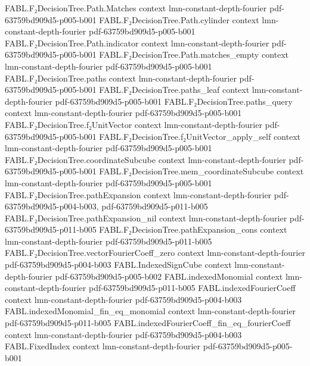 \begin{theorem}
\proofstep
  {FABL.F₂DecisionTree.Path.Matches}
  {context}
  {lmn-constant-depth-fourier}
  {pdf-63759bd909d5-p005-b001}
\proofstep
  {FABL.F₂DecisionTree.Path.cylinder}
  {context}
  {lmn-constant-depth-fourier}
  {pdf-63759bd909d5-p005-b001}
\proofstep
  {FABL.F₂DecisionTree.Path.indicator}
  {context}
  {lmn-constant-depth-fourier}
  {pdf-63759bd909d5-p005-b001}
\proofstep
  {FABL.F₂DecisionTree.Path.matches_empty}
  {context}
  {lmn-constant-depth-fourier}
  {pdf-63759bd909d5-p005-b001}
\proofstep
  {FABL.F₂DecisionTree.paths}
  {context}
  {lmn-constant-depth-fourier}
  {pdf-63759bd909d5-p005-b001}
\proofstep
  {FABL.F₂DecisionTree.paths_leaf}
  {context}
  {lmn-constant-depth-fourier}
  {pdf-63759bd909d5-p005-b001}
\proofstep
  {FABL.F₂DecisionTree.paths_query}
  {context}
  {lmn-constant-depth-fourier}
  {pdf-63759bd909d5-p005-b001}
\proofstep
  {FABL.F₂DecisionTree.f₂UnitVector}
  {context}
  {lmn-constant-depth-fourier}
  {pdf-63759bd909d5-p005-b001}
\proofstep
  {FABL.F₂DecisionTree.f₂UnitVector_apply_self}
  {context}
  {lmn-constant-depth-fourier}
  {pdf-63759bd909d5-p005-b001}
\proofstep
  {FABL.F₂DecisionTree.coordinateSubcube}
  {context}
  {lmn-constant-depth-fourier}
  {pdf-63759bd909d5-p005-b001}
\proofstep
  {FABL.F₂DecisionTree.mem_coordinateSubcube}
  {context}
  {lmn-constant-depth-fourier}
  {pdf-63759bd909d5-p005-b001}
\proofstep
  {FABL.F₂DecisionTree.pathExpansion}
  {context}
  {lmn-constant-depth-fourier}
  {pdf-63759bd909d5-p004-b003,
    pdf-63759bd909d5-p011-b005}
\proofstep
  {FABL.F₂DecisionTree.pathExpansion_nil}
  {context}
  {lmn-constant-depth-fourier}
  {pdf-63759bd909d5-p011-b005}
\proofstep
  {FABL.F₂DecisionTree.pathExpansion_cons}
  {context}
  {lmn-constant-depth-fourier}
  {pdf-63759bd909d5-p011-b005}
\proofstep
  {FABL.F₂DecisionTree.vectorFourierCoeff_zero}
  {context}
  {lmn-constant-depth-fourier}
  {pdf-63759bd909d5-p004-b003}
\proofstep
  {FABL.IndexedSignCube}
  {context}
  {lmn-constant-depth-fourier}
  {pdf-63759bd909d5-p005-b002}
\proofstep
  {FABL.indexedMonomial}
  {context}
  {lmn-constant-depth-fourier}
  {pdf-63759bd909d5-p011-b005}
\proofstep
  {FABL.indexedFourierCoeff}
  {context}
  {lmn-constant-depth-fourier}
  {pdf-63759bd909d5-p004-b003}
\proofstep
  {FABL.indexedMonomial_fin_eq_monomial}
  {context}
  {lmn-constant-depth-fourier}
  {pdf-63759bd909d5-p011-b005}
\proofstep
  {FABL.indexedFourierCoeff_fin_eq_fourierCoeff}
  {context}
  {lmn-constant-depth-fourier}
  {pdf-63759bd909d5-p004-b003}
\proofstep
  {FABL.FixedIndex}
  {context}
  {lmn-constant-depth-fourier}
  {pdf-63759bd909d5-p005-b001}

\end{theorem}
